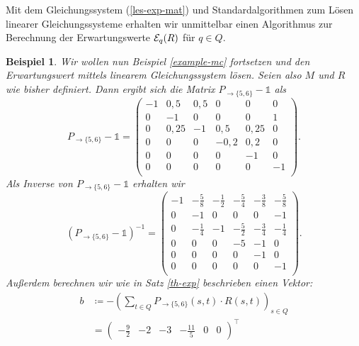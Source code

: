 \documentclass[a4paper]{article}
\newtheorem{beispiel}[satz]{Beispiel}
\theoremstyle{nonumberplain}
\begin{document}
Mit dem Gleichungssystem (\ref{les-exp-mat}) und Standardalgorithmen zum Lösen linearer Gleichungssysteme erhalten wir unmittelbar einen Algorithmus zur Berechnung der Erwartungswerte $\mathcal{E}_q(R)$ für $q \in Q$.

\begin{beispiel}\label{example-mc-exp-les}
	Wir wollen nun Beispiel \ref{example-mc} fortsetzen und den Erwartungswert mittels linearem Gleichungssystem lösen. Seien also $M$ und $R$ wie bisher definiert.
	Dann ergibt sich die Matrix $P_{\rightarrow \{5,6\}} - \mathbb{1}$ als
	\begin{equation*}
		P_{\rightarrow \{5,6\}} - \mathbb{1} = \begin{pmatrix}
			-1 & 0,5 & 0,5 & 0 & 0 & 0 \\
			0 & -1 & 0 & 0 & 0 & 1 \\
			0 & 0,25 & -1 & 0,5 & 0,25 & 0 \\
			0 & 0 & 0 & -0,2 & 0,2 & 0 \\
			0 & 0 & 0 & 0 & -1 & 0 \\
			0 & 0 & 0 & 0 & 0 & -1 \\
		\end{pmatrix}\text{.}
	\end{equation*}
	Als Inverse von $P_{\rightarrow \{5,6\}} - \mathbb{1}$ erhalten wir
	\begin{equation*}
		(P_{\rightarrow \{5,6\}} - \mathbb{1})^{-1} = \begin{pmatrix}
			-1 & -\frac{5}{8} & -\frac{1}{2} & -\frac{5}{4} & -\frac{3}{8} & -\frac{5}{8} \\
			0 & -1 & 0 & 0 & 0 & -1 \\
			0 & -\frac{1}{4} & -1 & -\frac{5}{2} & -\frac{3}{4} & -\frac{1}{4} \\
			0 & 0 & 0 & -5 & -1 & 0 \\
			0 & 0 & 0 & 0 & -1 & 0 \\
			0 & 0 & 0 & 0 & 0 & -1 \\
		\end{pmatrix}\text{.}
	\end{equation*}
	Außerdem berechnen wir wie in Satz \ref{th-exp} beschrieben einen Vektor:
	\begin{align*}
		b &\coloneqq - \left(\sum_{t \in Q}{ P_{\rightarrow \{5,6\}}(s,t) \cdot R(s,t) }\right)_{s \in Q} \\
		&= \begin{pmatrix} -\frac{9}{2} & -2 & -3 & -\frac{11}{5} & 0 & 0 \end{pmatrix}^\intercal
	\end{align*}

\end{beispiel}
\end{document}
